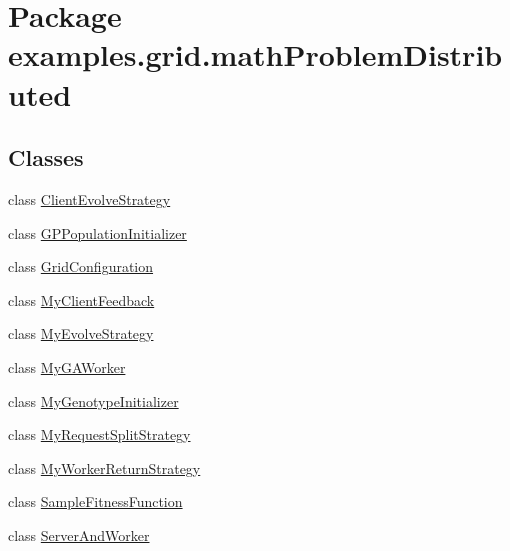 \hypertarget{namespaceexamples_1_1grid_1_1math_problem_distributed}{\section{Package examples.\-grid.\-math\-Problem\-Distributed}
\label{namespaceexamples_1_1grid_1_1math_problem_distributed}
}
\subsection*{Classes}
\begin{DoxyCompactItemize}
\item 
class \hyperlink{classexamples_1_1grid_1_1math_problem_distributed_1_1_client_evolve_strategy}{Client\-Evolve\-Strategy}
\item 
class \hyperlink{classexamples_1_1grid_1_1math_problem_distributed_1_1_g_p_population_initializer}{G\-P\-Population\-Initializer}
\item 
class \hyperlink{classexamples_1_1grid_1_1math_problem_distributed_1_1_grid_configuration}{Grid\-Configuration}
\item 
class \hyperlink{classexamples_1_1grid_1_1math_problem_distributed_1_1_my_client_feedback}{My\-Client\-Feedback}
\item 
class \hyperlink{classexamples_1_1grid_1_1math_problem_distributed_1_1_my_evolve_strategy}{My\-Evolve\-Strategy}
\item 
class \hyperlink{classexamples_1_1grid_1_1math_problem_distributed_1_1_my_g_a_worker}{My\-G\-A\-Worker}
\item 
class \hyperlink{classexamples_1_1grid_1_1math_problem_distributed_1_1_my_genotype_initializer}{My\-Genotype\-Initializer}
\item 
class \hyperlink{classexamples_1_1grid_1_1math_problem_distributed_1_1_my_request_split_strategy}{My\-Request\-Split\-Strategy}
\item 
class \hyperlink{classexamples_1_1grid_1_1math_problem_distributed_1_1_my_worker_return_strategy}{My\-Worker\-Return\-Strategy}
\item 
class \hyperlink{classexamples_1_1grid_1_1math_problem_distributed_1_1_sample_fitness_function}{Sample\-Fitness\-Function}
\item 
class \hyperlink{classexamples_1_1grid_1_1math_problem_distributed_1_1_server_and_worker}{Server\-And\-Worker}
\end{DoxyCompactItemize}
